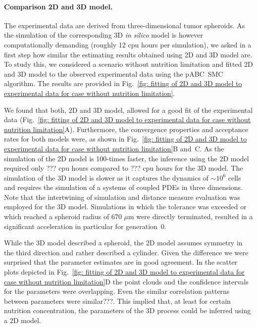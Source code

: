 \documentclass[10pt,letterpaper]{article}
\newcommand{\jh}[1]{{\color{red}#1}}
\newcommand{\nj}[1]{{\color{blue}#1}}
\begin{document}
\paragraph*{Comparison 2D and 3D model.}
The experimental data are derived from three-dimensional tumor spheroids. As the simulation of the corresponding 3D \textit{in silico} model is however computationally demanding (roughly 12 cpu hours per simulation), we asked in a first step how similar the estimating results obtained using 2D and 3D model are. To study this, we considered a scenario without nutrition limitation and fitted 2D and 3D model to the observed experimental data using the pABC~SMC algorithm. The results are provided in Fig.~\ref{fig: fitting of 2D and 3D model to experimental data for case without nutrition limitation}.

We found that both, 2D and 3D model, allowed for a good fit of the experimental data (Fig.~\ref{fig: fitting of 2D and 3D model to experimental data for case without nutrition limitation}A). Furthermore, the convergence properties and acceptance rates for both models were, as shown in Fig.~\ref{fig: fitting of 2D and 3D model to experimental data for case without nutrition limitation}B and~C. As the simulation of the 2D model is \nj{100-times} faster, the inference using the 2D model required only \jh{???} cpu hours compared to \jh{???} cpu hours for the 3D model. The simulation of the 3D model is slower as it captures the dynamics of \nj{$\sim10^6$ cells} and requires the simulation of a systems of coupled PDEs in three dimensions. Note that the intertwining of simulation and distance measure evaluation was employed for the 3D model. Simulations in which the tolerance was exceeded or which reached a spheroid radius of \nj{670 $\mu$m} were directly terminated, resulted in a significant acceleration in particular for generation~0.

While the 3D model described a spheroid, the 2D model assumes symmetry in the third direction and rather described a cylinder. Given the difference we were surprised that the parameter estimates are in good agreement. In the scatter plots depicted in Fig.~\ref{fig: fitting of 2D and 3D model to experimental data for case without nutrition limitation}D the point clouds and the confidence intervals for the parameters were overlapping. Even the similar correlation patterns between parameters were similar\jh{???}. This implied that, at least for certain nutrition concentration, the parameters of the 3D process could be inferred using a 2D model.
\end{document}
